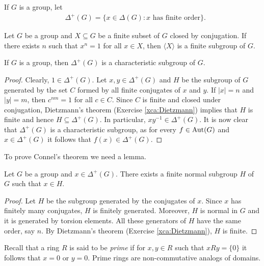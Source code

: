 If $G$ is a group, let 
\begin{align*}
	&\Delta^+(G)=\{x\in \Delta(G):\text{$x$ has finite order}\}.
\end{align*}

\begin{exercise}
        \label{xca:Dietzmann}
        Let $G$ be a group and $X\subseteq G$ be a finite subset of $G$ closed by
        conjugation. If there exists $n$ such that $x^n=1$ for all $x\in X$, then
        $\langle X\rangle$ is a finite subgroup of $G$.
\end{exercise}

\begin{proposition}
	\label{lem:DcharG}
	If $G$ is a group, then $\Delta^+(G)$ is a characteristic subgroup of $G$.
\end{proposition}

\begin{proof}
	Clearly, $1\in\Delta^+(G)$. 
	Let $x,y\in\Delta^+(G)$ and $H$ be the subgroup of $G$ generated by the set 
	$C$ formed by all finite conjugates of $x$ and $y$. If $|x|=n$ and 
	$|y|=m$, then $c^{nm}=1$ for all $c\in C$. 
	Since $C$ is finite and closed under conjugation, Dietzmann's theorem (Exercise \ref{xca:Dietzmann})
	implies that $H$ is finite and hence 
	$H\subseteq\Delta^+(G)$. In particular, $xy^{-1}\in\Delta^+(G)$. It is now clear
	that $\Delta^+(G)$ is a characteristic subgroup, as for 
	every $f\in\operatorname{Aut}(G)$ and $x\in\Delta^+(G)$ it follows that $f(x)\in\Delta^+(G)$. 
\end{proof}

To prove Connel's theorem we need a lemma. 

\begin{lemma}
	\label{lem:Connel}
	Let $G$ be a group and  $x\in\Delta^+(G)$. There exists a finite normal subgroup
	$H$ of $G$ such that $x\in H$.
\end{lemma}

\begin{proof}
	Let $H$ be the subgroup generated by the conjugates of $x$. Since $x$ has finitely many conjugates, 
	$H$ is finitely generated. Moreover, $H$ is normal in $G$ and it is generated by torsion elements. 
	All these generators of $H$ have the same order, say $n$. By Dietzmann's theorem (Exercise \ref{xca:Dietzmann}), 
	$H$ is finite. 
\end{proof}

Recall that a ring $R$ is said to be \emph{prime} 
if for $x,y\in R$ such that $xRy=\{0\}$ it follows that $x=0$ or $y=0$. Prime rings
are non-commutative analogs of domains. 

